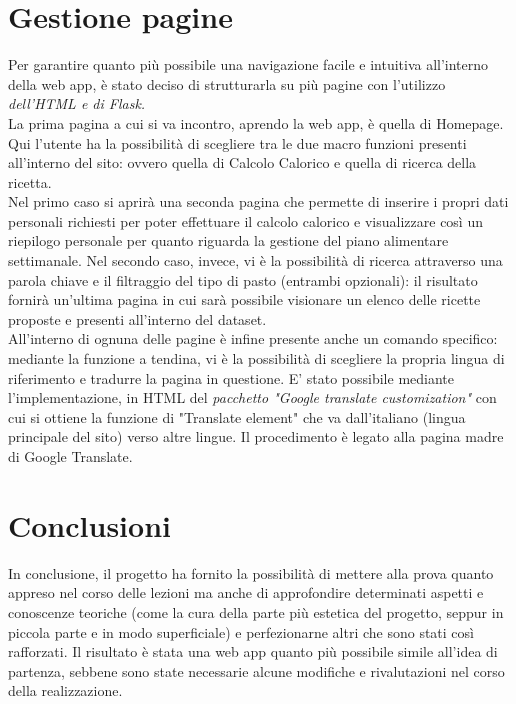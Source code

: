 \documentclass[11pt]{article}
\begin{document}
\section{Gestione pagine}Per garantire quanto più possibile una navigazione facile e intuitiva all'interno della web app, è stato deciso di strutturarla su più pagine con l'utilizzo \textit{dell'HTML e di Flask. }\\
La prima pagina a cui si va incontro, aprendo la web app, è quella di Homepage. Qui l'utente ha la possibilità di scegliere tra le due macro funzioni presenti all’interno del sito: ovvero quella di Calcolo Calorico e quella di ricerca della ricetta. \\
Nel primo caso si aprirà una seconda pagina che permette di inserire i propri dati personali richiesti per poter effettuare il calcolo calorico e visualizzare così un riepilogo personale per quanto riguarda la gestione del piano alimentare settimanale. Nel secondo caso, invece, vi è la possibilità di ricerca attraverso una parola chiave e il filtraggio del tipo di pasto (entrambi opzionali): il risultato fornirà un’ultima pagina in cui sarà possibile visionare un elenco delle ricette proposte e presenti all’interno del dataset.\\
All'interno di ognuna delle pagine è infine presente anche un comando specifico: mediante la funzione a tendina, vi è la possibilità di scegliere la propria lingua di riferimento e tradurre la pagina in questione. E' stato possibile mediante l'implementazione, in HTML del \textit{pacchetto "Google translate customization"} con cui si ottiene la funzione di "Translate element" che va dall'italiano (lingua principale del sito) verso altre lingue. Il procedimento è legato alla pagina madre di Google Translate. 

\section{Conclusioni} In conclusione, il progetto ha fornito la possibilità di mettere alla prova quanto appreso nel corso delle lezioni ma anche di approfondire determinati aspetti e conoscenze teoriche (come la cura della parte più estetica del progetto, seppur in piccola parte e in modo superficiale) e perfezionarne altri che sono stati così rafforzati. Il risultato è stata una web app quanto più possibile simile all’idea di partenza, sebbene sono state necessarie alcune modifiche e rivalutazioni nel corso della realizzazione. 
\end{document}
